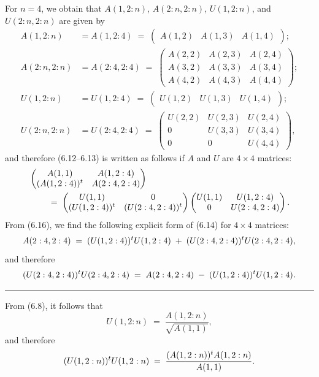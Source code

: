 \noindent For $n = 4$, we obtain that $A(1,2:n)$, $A(2:n,2:n)$, $U(1,2:n)$, and
$U(2:n,2:n)$ are given by
\begin{align*}
A(1,2:n) &= A(1,2:4) \;=\; \begin{pmatrix} A(1,2) & A(1,3) & A(1,4) \end{pmatrix}; \\
A(2:n,2:n) &= A(2:4,2:4) \;=\; \begin{pmatrix} A(2,2) & A(2,3) & A(2,4) \\ A(3,2) &
A(3,3) & A(3,4) \\ A(4,2) & A(4,3) & A(4,4) \end{pmatrix}; \\
U(1,2:n) &= U(1,2:4) \;=\; \begin{pmatrix} U(1,2) & U(1,3) & U(1,4) \end{pmatrix}; \\
U(2:n,2:n) &= U(2:4,2:4) \;=\; \begin{pmatrix} U(2,2) & U(2,3) & U(2,4) \\ 0 & U(3,3) &
U(3,4) \\ 0 & 0 & U(4,4) \end{pmatrix},
\end{align*}
and therefore (6.12--6.13) is written as follows if $A$ and $U$ are $4 \times 4$
matrices:
\begin{equation}
\begin{split}
&\begin{pmatrix} A(1,1) & A(1,2:4) \\ (A(1,2:4))^{t} & A(2:4,2:4) \end{pmatrix}\\
&\qquad\;=\;
\begin{pmatrix} U(1,1) & 0 \\ (U(1,2:4))^{t} & (U(2:4,2:4))^{t} \end{pmatrix}
\begin{pmatrix} U(1,1) & U(1,2:4) \\ 0 & U(2:4,2:4) \end{pmatrix}.
\end{split}
\end{equation}
From (6.16), we find the following explicit form of (6.14) for $4 \times 4$ matrices:
\[
A(2:4,2:4) \;=\; (U(1,2:4))^{t} U(1,2:4) \;+\; (U(2:4,2:4))^{t} U(2:4,2:4),
\]
and therefore
\begin{equation}
(U(2:4,2:4))^{t} U(2:4,2:4) \;=\; A(2:4,2:4) \;-\; (U(1,2:4))^{t} U(1,2:4).
\end{equation}

\noindent\rule{\linewidth}{0.4pt}
\medskip

From (6.8), it follows that
\[
U(1,2:n) \;=\; \frac{A(1,2:n)}{\sqrt{A(1,1)}},
\]
and therefore
\begin{equation}
(U(1,2:n))^{t} U(1,2:n) \;=\; \frac{(A(1,2:n))^{t} A(1,2:n)}{A(1,1)}.
\end{equation}
